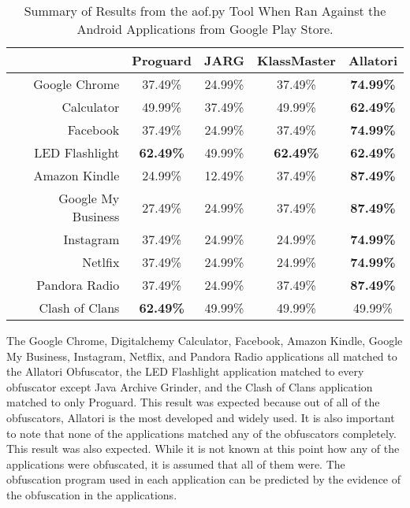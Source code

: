 \begin{table}[H]
\centering
\begin{tabular}{| r | c | c | c | c |}
\hline
 & Proguard & JARG & KlassMaster & Allatori \\
\hline
Google Chrome & 37.49\% & 24.99\% & 37.49\% & \textbf{74.99\%} \\
\hline
Calculator & 49.99\% & 37.49\% & 49.99\% & \textbf{62.49\%} \\
\hline
Facebook & 37.49\% & 24.99\% & 37.49\% & \textbf{74.99\%} \\
\hline
LED Flashlight & \textbf{62.49\%} & 49.99\% & \textbf{62.49\%} & \textbf{62.49\%} \\
\hline
Amazon Kindle & 24.99\% & 12.49\% & 37.49\% & \textbf{87.49\%} \\
\hline
Google My Business & 27.49\% & 24.99\% & 37.49\% & \textbf{87.49\%} \\
\hline
Instagram & 37.49\% & 24.99\% & 24.99\% & \textbf{74.99\%} \\
\hline
Netlfix & 37.49\% & 24.99\% & 24.99\% & \textbf{74.99\%} \\
\hline
Pandora Radio & 37.49\% & 24.99\% & 37.49\% & \textbf{87.49\%} \\
\hline
Clash of Clans & \textbf{62.49\%} & 49.99\% & 49.99\% & 49.99\% \\
\hline
\end{tabular}
\caption{Summary of Results from the aof.py Tool When Ran Against the Android Applications from Google Play Store. \label{fig:tgps}}
\end{table}
The Google Chrome, Digitalchemy Calculator, Facebook, Amazon Kindle, Google My Business, Instagram, Netflix, and Pandora Radio applications all matched to the Allatori Obfuscator, the LED Flashlight application matched to every obfuscator except Java Archive Grinder, and the Clash of Clans application matched to only Proguard. This result was expected because out of all of the obfuscators, Allatori is the most developed and widely used. It is also important to note that none of the applications matched any of the obfuscators completely. This result was also expected. While it is not known at this point how any of the applications were obfuscated, it is assumed that all of them were. The obfuscation program used in each application can be predicted by the evidence of the obfuscation in the applications.